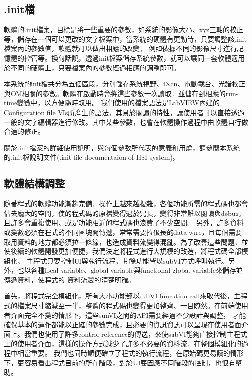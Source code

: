 \documentclass[12pt]{article}
\begin{document}
    \subsection{.init檔}
    軟體的.init檔案，目標是將一些重要的參數，如系統的影像大小、xyz三軸的校正等，儲存在一個可以更改的文字檔案中，當系統的硬體有更動時，只要調整該.init檔案內的參數值，軟體就可以做出相應的改變，
    例如依據不同的影像尺寸進行記憶體的控管等。換句話說，透過init檔案儲存系統參數，就可以讓同一套軟體適用於不同的硬體上，只要檔案內的參數經過相應的調整即可。

    本系統的init檔共分為五個區段，分別儲存系統視野、iXon、電動載台、光譜校正與OM相關的參數。軟體在啟動時會將這些參數一次讀取，並儲存到相應的run-time變數中，以方便隨時取用。
    我們使用的檔案語法是LabVIEW內建的Configuration file VIs所產生的語法，其易於閱讀的特性，讓使用者可以直接透過一般的文字編輯器進行修改。其中某些參數，也會在軟體操作過程中由軟體自行做合適的修正。

    關於.init檔案的詳細使用說明，與每個參數所代表的意義和用處，請參閱本系統的.init檔說明文件(.init file documentaion of HSI system)。
    \subsection{軟體結構調整}
    隨著程式的軟體功能漸趨完備，操作上越來越複雜，各個功能所需的程式碼也都會佔去龐大的空間，使的程式碼的原檔變得過於冗長，變得非常難以閱讀與debug。且許多會重複使用、或是功能相近的程式碼也浪費了不少空間。
    另外，許多資料或變數必須在程式的不同區塊間傳遞，常常需要拉很長的data wire，且每個需要取用資料的地方都必須拉一條線，也造成資料流變得混亂。為了改善這些問題，並使後續的軟體開發更加便捷，我們決定將程式進行大規模的改造，將程式碼全部模組化，
    主程式只要控制UI與執行流程，其餘功能皆以subVI方式呼叫執行。另外，也以各種local variable、global variable與functional global variable來儲存並傳遞資料，使程式的
    資料流變的清楚明確。
    
    首先，將程式完全模組化，所有大小功能都以subVI funcation call來取代後，主程式的檔案尺寸縮減至一半，整體的程式碼也變得更加整齊、一目瞭然。在前端使用者介面完全不變的情形下，這些sunVI之間的API需要經過不少設計與調整，
    才能確保基本的運作都能以正確的參數完成，且必要的資訊資訊可以呈現在使用者面介面上。我們也使用了許多control reference的傳送，來使subVI能夠直接控制主程式上的使用者介面，這樣的操作方式減少了許多不必要的資料流，在整個模組化的過程中相當重要。
    我們也同時順便確立了程式的執行流程，在原始碼更易讀的情形下，更容易看出程式目前的所在階段，對於UI要因應不同階段的控制，也很有幫助。
\end{document}
